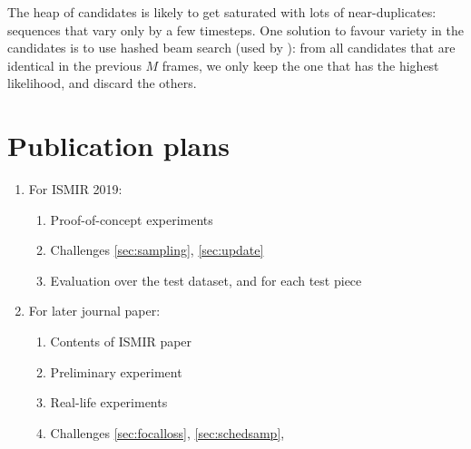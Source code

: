 \documentclass{article}
\begin{document}
The heap of candidates is likely to get saturated with lots of near-duplicates: sequences that vary only by a few timesteps.
One solution to favour variety in the candidates is to use hashed beam search (used by \citep{Korzeniowski2018}):
from all candidates that are identical in the previous $M$ frames, we only keep the one that has the highest likelihood, and discard the others.


\section{Publication plans}

\begin{enumerate}
\item For ISMIR 2019: 
	\begin{enumerate}
	\item Proof-of-concept experiments
	\item Challenges \ref{sec:sampling}, \ref{sec:update}
	\item Evaluation over the test dataset, and for each test piece
	\end{enumerate}

\item For later journal paper:
	\begin{enumerate}
	\item Contents of ISMIR paper
	\item Preliminary experiment
	\item Real-life experiments
	\item Challenges \ref{sec:focalloss}, \ref{sec:schedsamp},
	\end{enumerate}
\end{enumerate}



\end{document}
